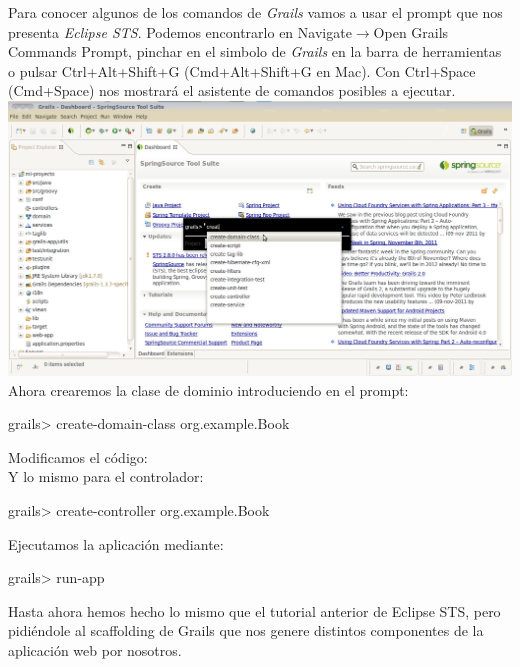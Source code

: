 \documentclass[a4paper,12pt,spanish]{article}
\begin{document}
Para conocer algunos de los comandos de {\it Grails} vamos a usar el prompt que nos presenta {\it Eclipse STS}. Podemos encontrarlo en Navigate$\rightarrow$Open Grails Commands Prompt, pinchar en el simbolo de {\it Grails} en la barra de herramientas o pulsar Ctrl+Alt+Shift+G (Cmd+Alt+Shift+G en Mac). Con Ctrl+Space (Cmd+Space) nos mostrará el asistente de comandos posibles a ejecutar.\\

\includegraphics[scale=0.35]{create-domain}\\

Ahora crearemos la clase de dominio introduciendo en el prompt:
\begin{listing}[style=consola]
grails> create-domain-class org.example.Book
\end{listing}

Modificamos el código:\\



Y lo mismo para el controlador:

\begin{listing}[style=consola]
grails> create-controller org.example.Book
\end{listing}




Ejecutamos la aplicación mediante:

\begin{listing}[style=consola]
grails> run-app
\end{listing}

Hasta ahora hemos hecho lo mismo que el tutorial anterior de Eclipse STS, pero pidiéndole al scaffolding de Grails que nos genere distintos componentes de la aplicación web por nosotros.
\end{document}

